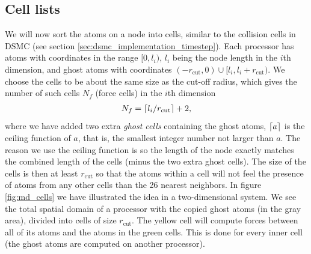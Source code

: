 \subsection{Cell lists}
We will now sort the atoms on a node into cells, similar to the collision cells in DSMC (see section \ref{sec:dsmc_implementation_timestep}). Each processor has atoms with coordinates in the range $[0, l_i)$, $l_i$ being the node length in the $i$th dimension, and ghost atoms with coordinates $(-r_\text{cut}, 0) \cup [l_i, l_i + r_\text{cut})$. We choose the cells to be about the same size as the cut-off radius, which gives the number of such cells $N_f$ (force cells) in the $i$th dimension
\begin{align}
	N_f = \lceil l_i / r_\text{cut}\rceil + 2,
\end{align}
where we have added two extra \textit{ghost cells} containing the ghost atoms, $\lceil a\rceil$ is the ceiling function of $a$, that is, the smallest integer number not larger than $a$. The reason we use the ceiling function is so the length of the node exactly matches the combined length of the cells (minus the two extra ghost cells). The size of the cells is then at least $r_\text{cut}$ so that the atoms within a cell will not feel the presence of atoms from any other cells than the 26 nearest neighbors. In figure \ref{fig:md_cells} we have illustrated the idea in a two-dimensional system. We see the total spatial domain of a processor with the copied ghost atoms (in the gray area), divided into cells of size $r_\text{cut}$. The yellow cell will compute forces between all of its atoms and the atoms in the green cells. This is done for every inner cell (the ghost atoms are computed on another processor).
